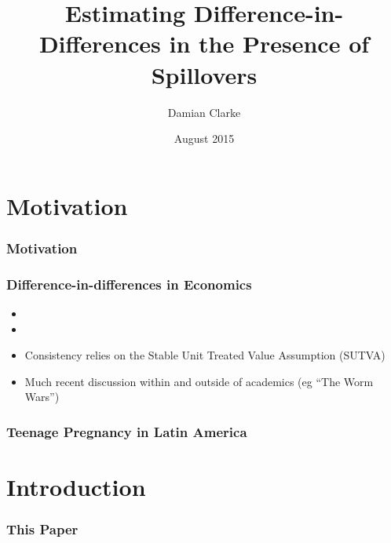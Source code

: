 \documentclass[10pt,letterpaper,subeqn]{beamer}
\title{Estimating Difference-in-Differences in the Presence of Spillovers}
\author{Damian Clarke\inst{\dag} }
\institute{\inst{\dag}  University of Oxford}
\date{August 2015}
\begin{document}
\begin{frame}
\titlepage
\end{frame}

\section{Motivation}
\begin{frame}[label=motivation]
  \frametitle{Motivation}

\end{frame}

\begin{frame}[label=DDM]
  \frametitle{Difference-in-differences in Economics}
\begin{itemize}
 \item 
 \item 
 \item Consistency relies on the Stable Unit Treated Value Assumption (SUTVA)
 \item Much recent discussion within and outside of academics (eg ``The Worm Wars'')
\end{itemize}
\end{frame}

\begin{frame}[label=teenPreg]
  \frametitle{Teenage Pregnancy in Latin America}

\end{frame}


\section{Introduction}
\begin{frame}[label=int1]
  \frametitle{This Paper}

\end{frame}




\end{document}
